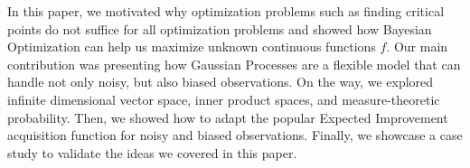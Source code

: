 In this paper, we motivated why optimization problems such as finding
critical points do not suffice for all optimization problems and showed how
Bayesian Optimization can help us maximize unknown continuous functions $f$.
Our main contribution was presenting how Gaussian Processes are a flexible model that
can handle not only noisy, but also biased observations.
On the way, we explored infinite dimensional vector space, inner product spaces, and measure-theoretic probability.
Then, we showed how to adapt the popular Expected Improvement acquisition function for noisy and biased observations.
Finally, we showcase a case study to validate the ideas we covered in this paper.


